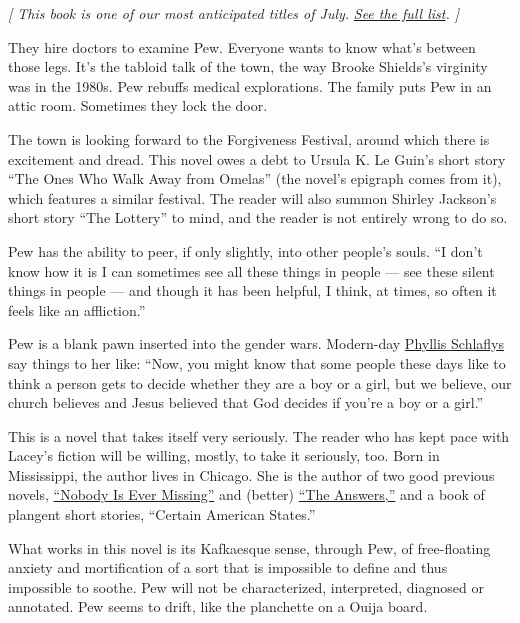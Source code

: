 \emph{{[} This book is one of our most anticipated titles of July.}
\href{https://www.nytimes3xbfgragh.onion/2020/06/24/books/new-july-books.html}{\emph{See
the full list}}\emph{. {]}}

They hire doctors to examine Pew. Everyone wants to know what's between
those legs. It's the tabloid talk of the town, the way Brooke Shields's
virginity was in the 1980s. Pew rebuffs medical explorations. The family
puts Pew in an attic room. Sometimes they lock the door.

The town is looking forward to the Forgiveness Festival, around which
there is excitement and dread. This novel owes a debt to Ursula K. Le
Guin's short story ``The Ones Who Walk Away from Omelas'' (the novel's
epigraph comes from it), which features a similar festival. The reader
will also summon Shirley Jackson's short story ``The Lottery'' to mind,
and the reader is not entirely wrong to do so.

Pew has the ability to peer, if only slightly, into other people's
souls. ``I don't know how it is I can sometimes see all these things in
people --- see these silent things in people --- and though it has been
helpful, I think, at times, so often it feels like an affliction.''

Pew is a blank pawn inserted into the gender wars. Modern-day
\href{https://www.nytimes3xbfgragh.onion/2020/04/10/arts/television/mrs-america-cate-blanchett.html}{Phyllis
Schlaflys} say things to her like: ``Now, you might know that some
people these days like to think a person gets to decide whether they are
a boy or a girl, but we believe, our church believes and Jesus believed
that God decides if you're a boy or a girl.''

This is a novel that takes itself very seriously. The reader who has
kept pace with Lacey's fiction will be willing, mostly, to take it
seriously, too. Born in Mississippi, the author lives in Chicago. She is
the author of two good previous novels,
\href{https://www.nytimes3xbfgragh.onion/2014/07/23/books/catherine-laceys-nobody-is-ever-missing.html}{``Nobody
Is Ever Missing''} and (better)
\href{https://www.nytimes3xbfgragh.onion/2017/05/30/books/review-answers-catherine-lacey.html}{``The
Answers,''} and a book of plangent short stories, ``Certain American
States.''

What works in this novel is its Kafkaesque sense, through Pew, of
free-floating anxiety and mortification of a sort that is impossible to
define and thus impossible to soothe. Pew will not be characterized,
interpreted, diagnosed or annotated. Pew seems to drift, like the
planchette on a Ouija board.

